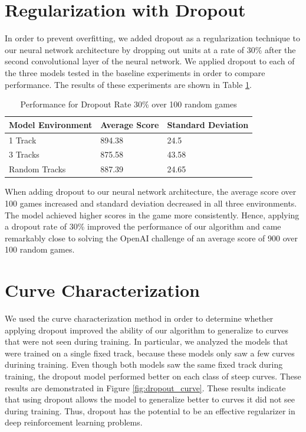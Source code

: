 \section{Regularization with Dropout}
In order to prevent overfitting, we added dropout as a regularization technique to our neural network architecture by dropping out units at a rate of 30\% after the second convolutional layer of the neural network. We applied dropout to each of the three models tested in the baseline experiments in order to compare performance. The results of these experiments are shown in Table \ref{table:dropout}. 

\begin{table}[h]
\centering
\begin{tabular}{ m{4cm} | m{3cm}| m{3.5cm} } 
Model Environment & Average Score & Standard Deviation  \\
\hline 
1 Track & 894.38 & 24.5  \\
3 Tracks & 875.58 & 43.58 \\
Random Tracks & 887.39 & 24.65 \\
\end{tabular}
\caption{Performance for Dropout Rate 30\% over 100 random games}
\label{table:dropout}
\end{table}

When adding dropout to our neural network architecture, the average score over 100 games increased and standard deviation decreased in all three environments. The model achieved higher scores in the game more consistently. Hence, applying a dropout rate of 30\% improved the performance of our algorithm and came remarkably close to solving the OpenAI challenge of an average score of 900 over 100 random games.


\section{Curve Characterization}
We used the curve characterization method in order to determine whether applying dropout improved the ability of our algorithm to generalize to curves that were not seen during training. In particular, we analyzed the models that were trained on a single fixed track, because these models only saw a few curves durining training. Even though both models saw the same fixed track during training, the dropout model performed better on each class of steep curves. These results are demonstrated in Figure \ref{fig:dropout_curve}. These results indicate that using dropout allows the model to generalize better to curves it did not see during training. Thus, dropout has the potential to be an effective regularizer in deep reinforcement learning problems.

